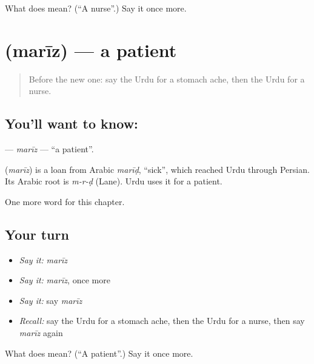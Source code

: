 \begin{tcolorbox}[breakable,colback=teal!4,colframe=teal!35!black,title={Before you move on}]
What does  mean? (\textquotedblleft{}A nurse\textquotedblright{}.) Say it once more.
\end{tcolorbox}
\section[\texorpdfstring{\ur{مریض} (marīz)}{مریض (marīz)}]{ (marīz) — a patient}

\label{lesson:UR-C153-mariz}



\begin{quote}
Before the new one: say the Urdu for a stomach ache, then the Urdu for a nurse.
\end{quote}

\subsection*{You'll want to know: }
\textbf{} — \emph{marīz} — \textquotedblleft{}a patient\textquotedblright{}.

\begin{cousinweb}
\textbf{} (\emph{marīz}) is a loan from Arabic \emph{marīḍ}, \textquotedblleft{}sick\textquotedblright{}, which reached Urdu through Persian. Its Arabic root is \emph{m-r-ḍ} (Lane). Urdu uses it for a patient.
\end{cousinweb}

\begin{grammarlens}[title={What you've built}]
One more word for this chapter.
\end{grammarlens}

\subsection*{Your turn}
\begin{itemize}
\raggedright
  \item \emph{Say it:} \emph{marīz}
  \item \emph{Say it:} \emph{marīz}, once more
  \item \emph{Say it:} say \emph{marīz}
  \item \emph{Recall:} say the Urdu for a stomach ache, then the Urdu for a nurse, then say \emph{marīz} again
\end{itemize}

\begin{tcolorbox}[breakable,colback=teal!4,colframe=teal!35!black,title={Before you move on}]
What does  mean? (\textquotedblleft{}A patient\textquotedblright{}.) Say it once more.
\end{tcolorbox}
